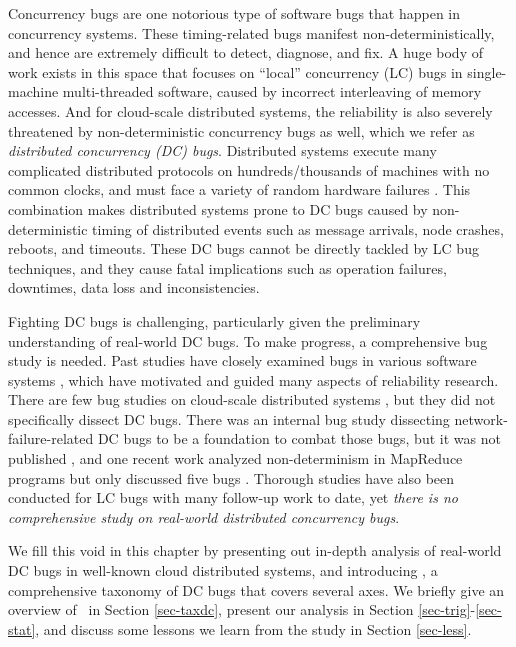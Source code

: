 
Concurrency bugs are one notorious type of software bugs that happen in
concurrency systems. These timing-related bugs manifest non-deterministically,
and hence are extremely difficult to detect, diagnose, and fix. A huge body of
work exists in this space that focuses on ``local'' concurrency (LC) bugs in
single-machine multi-threaded software, caused by incorrect interleaving of
memory accesses. And for cloud-scale distributed systems, the reliability is
also severely threatened by non-deterministic concurrency bugs as well, which we
refer as {\em distributed concurrency (DC) bugs}. Distributed systems execute
many complicated distributed protocols on hundreds/thousands of machines with no
common clocks, and must face a variety of random hardware failures
\cite{Do+13-Limplock, Gunawi+14-Cbs}. This combination makes distributed
systems prone to DC bugs caused by non-deterministic timing of distributed
events such as message arrivals, node crashes, reboots, and timeouts. These DC
bugs cannot be directly tackled by LC bug techniques, and they cause fatal
implications such as operation failures, downtimes, data loss and
inconsistencies.

Fighting DC bugs is challenging, particularly given the preliminary
understanding of real-world DC bugs.  To make progress, a comprehensive bug
study is needed. Past studies have closely examined bugs in various software
systems \cite{Chou+01-Empirical, Lu+13-FsEvolution, linux.asplos11}, which have
motivated and guided many aspects of reliability research.
%
There are few bug studies on cloud-scale distributed systems
\cite{Gunawi+14-Cbs, Li+13-ScopeBugStudy}, but they did not specifically dissect
DC bugs. There was an internal bug study dissecting network-failure-related DC
bugs to be a foundation to combat those bugs, but it was not published
\cite{Joshi+13-SetsudoTesting}, and one recent work analyzed non-determinism in
MapReduce programs but only discussed five bugs \cite{Xiao+14-NonDetMR}.
%
Thorough studies have also been conducted for LC bugs \cite{study.dsn10,
Lu+08-ConcurrencyBugStudy} with many follow-up work to date, yet {\em there is
no comprehensive study on real-world distributed concurrency bugs}. 

We fill this void in this chapter by presenting out in-depth analysis of
real-world DC bugs in well-known cloud distributed systems, and introducing
\taxdc, a comprehensive taxonomy of DC bugs that covers several axes. We briefly
give an overview of \taxdc\ in Section \ref{sec-taxdc}, present our analysis in
Section \ref{sec-trig}-\ref{sec-stat}, and discuss some lessons we learn from
the study in Section \ref{sec-less}.

